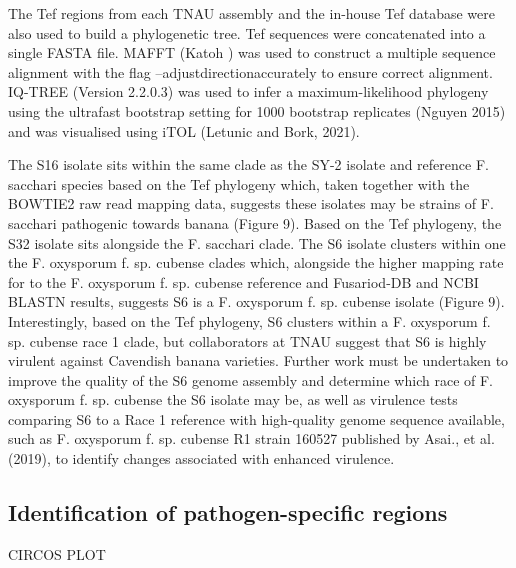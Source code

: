 The \ac{Tef} regions from each TNAU assembly and the in-house \ac{Tef} database were also used to build a phylogenetic tree. \ac{Tef} sequences were concatenated into a single FASTA file. MAFFT (Katoh ) was used to construct a multiple sequence alignment with the flag --adjustdirectionaccurately to ensure correct alignment. IQ-TREE (Version 2.2.0.3) was used to infer a maximum-likelihood phylogeny using the ultrafast bootstrap setting for 1000 bootstrap replicates (Nguyen 2015) and was visualised using iTOL (Letunic and Bork, 2021). 

The S16 isolate sits within the same clade as the SY-2 isolate and reference F. sacchari species based on the \ac{Tef} phylogeny which, taken together with the BOWTIE2 raw read mapping data, suggests these isolates may be strains of F. sacchari pathogenic towards banana (Figure 9). Based on the \ac{Tef} phylogeny, the S32 isolate sits alongside the F. sacchari clade. The S6 isolate clusters within one the F. oxysporum f. sp. cubense clades which, alongside the higher mapping rate for to the F. oxysporum f. sp. cubense reference and Fusariod-DB and NCBI BLASTN results, suggests S6 is a F. oxysporum f. sp. cubense isolate (Figure 9). Interestingly, based on the \ac{Tef} phylogeny, S6 clusters within a F. oxysporum f. sp. cubense race 1 clade, but collaborators at TNAU suggest that S6 is highly virulent against Cavendish banana varieties. Further work must be undertaken to improve the quality of the S6 genome assembly and determine which race of F. oxysporum f. sp. cubense the S6 isolate may be, as well as virulence tests comparing S6 to a Race 1 reference with high-quality genome sequence available, such as F. oxysporum f. sp. cubense R1 strain 160527 published by Asai., et al. (2019), to identify changes associated with enhanced virulence.


\subsection{Identification of pathogen-specific regions}
CIRCOS PLOT

